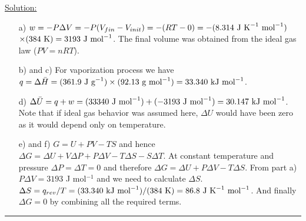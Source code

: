 \noindent
\underline{Solution:}\\

\begin{itemize}

\item[a)] $w = -P\Delta V = -P(V_{fin} - V_{init}) = -(RT - 0) = -(8.314\textnormal{ J K}^{-1}\textnormal{ mol}^{-1})$ $\times (384\textnormal{ K}) = 3193\textnormal{ J mol}^{-1}$. The final volume was obtained from the ideal gas law ($PV = nRT$).

\item[b) and c)] For vaporization process we have $q = \Delta\bar{H} = (361.9\textnormal{ J g}^{-1})\times (92.13\textnormal{ g mol}^{-1}) = 33.340\textnormal{ kJ mol}^{-1}$.

\item[d)] $\Delta\bar{U} = q + w = (33340\textnormal{ J mol}^{-1}) + (-3193\textnormal{ J mol}^{-1}) = 30.147\textnormal{ kJ mol}^{-1}$. Note that if ideal gas
behavior was assumed here, $\Delta U$ would have been zero as it would depend only on temperature.

\item[e) and f)] $G = U + PV - TS$ and hence $\Delta G = \Delta U + V\Delta P + P\Delta V - T\Delta S - S\Delta T$. At constant temperature and pressure $\Delta P = \Delta T = 0$ and therefore $\Delta G = \Delta U + P\Delta V - T\Delta S$. From part a) $P\Delta V = 3193$ J mol$^{-1}$ and we need to calculate $\Delta S$. $\Delta S = q_{rev} / T = (33.340\textnormal{ kJ mol}^{-1}) / (384\textnormal{ K}) = 86.8\textnormal{ J K}^{-1}\textnormal{ mol}^{-1}$. And finally $\Delta G = 0$ by combining all the required terms.

\end{itemize}

\hrule\vspace{0.5cm}
